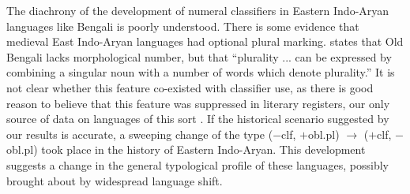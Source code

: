 \documentclass[11pt]{article}
\begin{document}
The diachrony of the development of numeral classifiers in Eastern Indo-Aryan languages like Bengali is poorly understood. There is some evidence that medieval East Indo-Aryan languages had optional plural marking. \citet[23]{Mukherji1963} states that Old Bengali lacks morphological number, but that ``plurality ... can be expressed by combining a singular noun with a number of words which denote plurality.'' It is not clear whether this feature co-existed with classifier use, as there is good reason to believe that this feature was suppressed in literary registers, our only source of data on languages of this sort \citep[cf.][]{BarzDiller1985}. 
If the historical scenario suggested by our results is accurate, a sweeping change of the type {\sc ($-$clf, $+$obl.pl)} $\rightarrow$ {\sc ($+$clf, $-$obl.pl)} took place in the history of Eastern Indo-Aryan. This development suggests a change in the general typological profile of these languages, possibly brought about by widespread language shift. 
\end{document}
